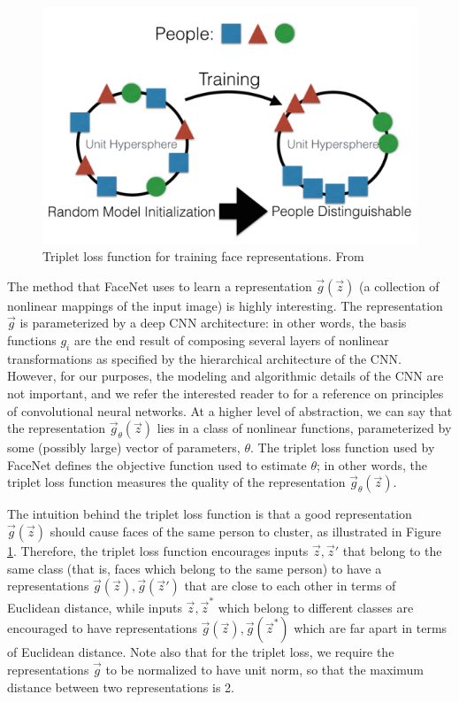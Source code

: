 \begin{figure}
\centering
\includegraphics[scale = 0.5]{Figures/triplet_loss.png}
\caption{Triplet loss function for training face representations.  From \cite{amos2016openface}}
\label{fig:triplet_loss}
\end{figure}

The method that FaceNet uses to learn a representation
$\vec{g}(\vec{z})$ (a collection of nonlinear mappings of the input
image) is highly interesting.  The representation $\vec{g}$ is
parameterized by a deep CNN architecture: in other words, the basis
functions $g_i$ are the end result of composing several layers of
nonlinear transformations as specified by the hierarchical
architecture of the CNN.  However, for our purposes, the modeling and
algorithmic details of the CNN are not important, and we refer the
interested reader to \cite{lecun2013deep} for a reference on principles of
convolutional neural networks.  At a higher level of abstraction, we
can say that the representation $\vec{g}_\theta(\vec{z})$ lies in a
class of nonlinear functions, parameterized by some (possibly large)
vector of parameters, $\theta$.  The triplet loss function used by
FaceNet defines the objective function used to estimate $\theta$;
in other words, the triplet loss function measures the quality of the
representation $\vec{g}_\theta(\vec{z})$.

The intuition behind the triplet loss function is that a good
representation $\vec{g}(\vec{z})$ should cause faces of the same
person to cluster, as illustrated in Figure \ref{fig:triplet_loss}.
Therefore, the triplet loss function encourages inputs $\vec{z},
\vec{z}'$ that belong to the same class (that is, faces which belong
to the same person) to have a representations $\vec{g}(\vec{z}),
\vec{g}(\vec{z}')$ that are close to each other in terms of Euclidean
distance, while inputs $\vec{z}, \vec{z}^*$ which belong to different
classes are encouraged to have representations $\vec{g}(\vec{z}),
\vec{g}(\vec{z}^*)$ which are far apart in terms of Euclidean
distance.  Note also that for the triplet loss, we require the
representations $\vec{g}$ to be normalized to have unit norm, so that
the maximum distance between two representations is 2.

